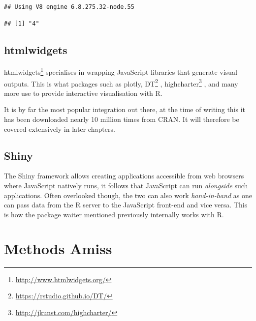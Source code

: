 \documentclass[
]{krantz}
\makeatletter
\newenvironment{Shaded}{\begin{snugshade}}{\end{snugshade}}
\newcommand{\CommentTok}[1]{\textcolor[rgb]{0.37,0.37,0.37}{\textit{#1}}}
\newcommand{\KeywordTok}[1]{\textcolor[rgb]{0.27,0.27,0.27}{\textbf{#1}}}
\newcommand{\NormalTok}[1]{#1}
\newcommand{\OperatorTok}[1]{\textcolor[rgb]{0.43,0.43,0.43}{\textbf{#1}}}
\newcommand{\StringTok}[1]{\textcolor[rgb]{0.5,0.5,0.5}{#1}}
\renewcommand{\href}[2]{#2\footnote{\url{#1}}}
\newenvironment{kframe}{%
\medskip{}
\setlength{\fboxsep}{.8em}
 \def\at@end@of@kframe{}%
 \ifinner\ifhmode%
  \def\at@end@of@kframe{\end{minipage}}%
  \begin{minipage}{\columnwidth}%
 \fi\fi%
 \def\FrameCommand##1{\hskip\@totalleftmargin \hskip-\fboxsep
 \colorbox{shadecolor}{##1}\hskip-\fboxsep
     \hskip-\linewidth \hskip-\@totalleftmargin \hskip\columnwidth}%
 \MakeFramed {\advance\hsize-\width
   \@totalleftmargin\z@ \linewidth\hsize
   \@setminipage}}%
 {\par\unskip\endMakeFramed%
 \at@end@of@kframe}
\renewenvironment{Shaded}{\begin{kframe}}{\end{kframe}}
\makeatother
\begin{document}
\begin{verbatim}
## Using V8 engine 6.8.275.32-node.55
\end{verbatim}

\begin{Shaded}
\end{Shaded}

\begin{verbatim}
## [1] "4"
\end{verbatim}

\hypertarget{intro-htmlwidgets}{%
\subsection{htmlwidgets}\label{intro-htmlwidgets}}

\href{http://www.htmlwidgets.org/}{htmlwidgets} \citep{R-htmlwidgets} specialises in wrapping JavaScript libraries that generate visual outputs. This is what packages such as plotly, \href{https://rstudio.github.io/DT/}{DT} \citep{R-DT}, \href{http://jkunst.com/highcharter/}{highcharter} \citep{R-highcharter}, and many more use to provide interactive visualisation with R.

It is by far the most popular integration out there, at the time of writing this it has been downloaded nearly 10 million times from CRAN. It will therefore be covered extensively in later chapters.

\hypertarget{intro-shiny}{%
\subsection{Shiny}\label{intro-shiny}}

The Shiny framework allows creating applications accessible from web browsers where JavaScript natively runs, it follows that JavaScript can run \emph{alongside} such applications. Often overlooked though, the two can also work \emph{hand-in-hand} as one can pass data from the R server to the JavaScript front-end and vice versa. This is how the package waiter mentioned previously internally works with R.

\hypertarget{intro-amiss}{%
\section{Methods Amiss}\label{intro-amiss}}
\end{document}
